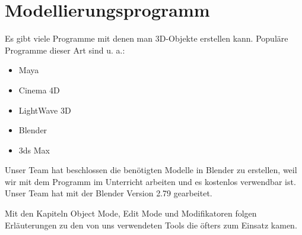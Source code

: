 \section{Modellierungsprogramm}
Es gibt viele Programme mit denen man 3D-Objekte erstellen kann.\citep{wiki:modellierungsprogramm_beispiele}
Populäre Programme dieser Art sind u. a.:
\begin{itemize}
    \item Maya
    \item Cinema 4D
    \item LightWave 3D
    \item Blender
    \item 3ds Max
\end{itemize}

Unser Team hat beschlossen die benötigten Modelle in Blender zu erstellen, weil wir mit dem Programm im Unterricht arbeiten und
es kostenlos verwendbar ist. Unser Team hat mit der Blender Version 2.79 gearbeitet.

Mit den Kapiteln Object Mode, Edit Mode und Modifikatoren folgen Erläuterungen zu
den von uns verwendeten Tools die öfters zum Einsatz kamen.
